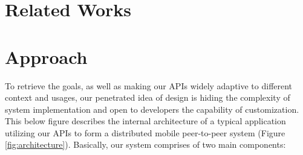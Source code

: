 \documentclass[conference]{IEEEtran}
\begin{document}
%




\section{Related Works}

\section{Approach}
To retrieve the goals, as well as making our APIs widely adaptive to different context and usages, our penetrated idea of design is hiding the complexity of system implementation and open to developers the capability of customization. This below figure describes the internal architecture of a typical application utilizing our APIs to form a distributed mobile peer-to-peer system (Figure \ref{fig:architecture}). Basically, our system comprises of two main components:
\end{document}

